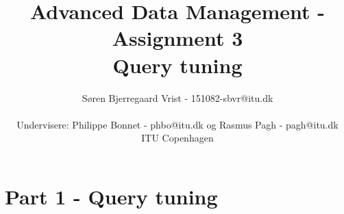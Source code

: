 
\title{Advanced Data Management - Assignment 3\\Query tuning}
\author{S\o ren Bjerregaard Vrist - 151082-sbvr@itu.dk\\ \\Undervisere: Philippe
Bonnet - phbo@itu.dk og
Rasmus Pagh - pagh@itu.dk\\ITU Copenhagen}

\maketitle
\newpage

\chapter{Part 1 - Query tuning}

